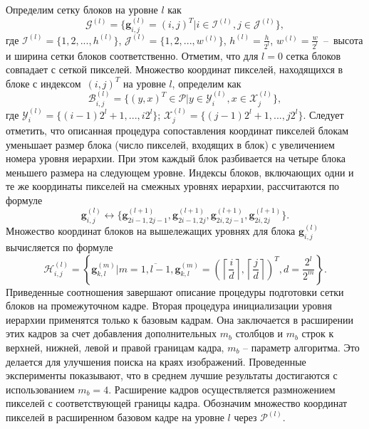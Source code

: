 Определим сетку блоков на уровне $l$ как
\begin{equation*}
\mathcal{G}^{(l)} = \lbrace \mathbf{g}_{i,j}^{(l)}=(i,j)^T \vert i \in \mathcal{I}^{(l)}, j \in \mathcal{J}^{(l)} \rbrace,
\end{equation*}
где $\mathcal{I}^{(l)}=\lbrace 1,2,...,h^{(l)}\rbrace$, $\mathcal{J}^{(l)}=\lbrace 1,2,...,w^{(l)}\rbrace$, $h^{(l)}=\frac{h}{2^l}$, $w^{(l)}=\frac{w}{2^l}$~--~высота и ширина сетки блоков соответственно. Отметим, что для $l=0$ сетка блоков совпадает с сеткой пикселей. Множество координат пикселей, находящихся в блоке с индексом~$(i, j)^T$ на уровне $l$, определим как
\begin{equation*}
\mathcal{B}_{i,j}^{(l)} = \lbrace (y,x)^T \in \mathcal{P} \vert y \in \mathcal{Y}_i^{(l)}, x \in \mathcal{X}_j^{(l)} \rbrace,
\end{equation*}
где $\mathcal{Y}_i^{(l)}=\lbrace (i-1)2^l+1,..., i 2^l \rbrace$; $\mathcal{X}_j^{(l)}=\lbrace (j-1) 2^l+1,..., j 2^l\rbrace$.
Следует отметить, что описанная процедура сопоставления координат пикселей блокам уменьшает размер блока (число пикселей, входящих в блок) с увеличением номера уровня иерархии. При этом каждый блок разбивается на четыре блока меньшего размера на следующем уровне. Индексы блоков, включающих одни и те же координаты пикселей на смежных уровнях иерархии, рассчитаются по формуле
\begin{equation}
\mathbf{g}_{i,j}^{(l)} \leftrightarrow 
\lbrace
\mathbf{g}_{2i-1,2j-1}^{(l+1)},
\mathbf{g}_{2i-1,2j}^{(l+1)},
\mathbf{g}_{2i,2j-1}^{(l+1)},
\mathbf{g}_{2i,2j}^{(l+1)}
\rbrace.
\end{equation}
Множество координат блоков на вышележащих уровнях для блока $\mathbf{g}_{i,j}^{(l)}$ вычисляется по формуле
\begin{equation}
\mathcal{H}_{i,j}^{(l)} = 
\left\lbrace \mathbf{g}_{k,l}^{(m)} \vert m = \overline{1,l-1},
\mathbf{g}_{k,l}^{(m)}=\left(\left\lceil\frac{i}{d}\right\rceil,\left\lceil\frac{j}{d}\right\rceil\right)^T,d=\frac{2^l}{2^m}\right\rbrace.
\end{equation}
Приведенные соотношения завершают описание процедуры подготовки сетки блоков на промежуточном кадре. Вторая процедура инициализации уровня иерархии применятся только к базовым кадрам. Она заключается в расширении этих кадров за счет добавления дополнительных $m_b$ столбцов и $m_b$ строк к верхней, нижней, левой и правой границам кадра, $m_b$ – параметр алгоритма. Это делается для улучшения поиска на краях изображений. Проведенные эксперименты показывают, что в среднем лучшие результаты достигаются с использованием $m_b=4$. Расширение кадров осуществляется размножением пикселей с соответствующей границы кадра. Обозначим множество координат пикселей в расширенном базовом кадре на уровне $l$ через $\mathcal{P}^{(l)}$.

